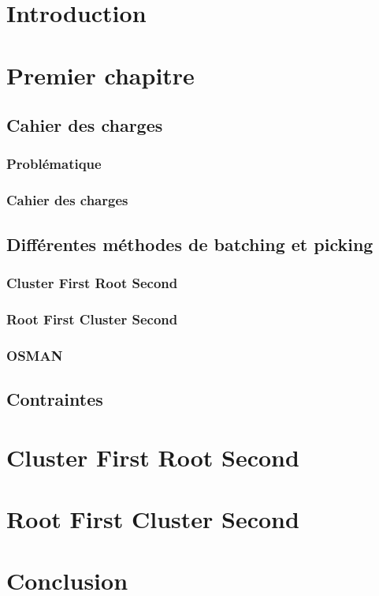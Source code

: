 \documentclass[twoside,UTF8]{EPURapport}
\begin{document}

\chapter{Introduction}


\chapter{Premier chapitre}

\section{Cahier des charges}
\subsection{Problématique}

\subsection{Cahier des charges}

\section{Différentes méthodes de batching et picking}
\subsection{Cluster First Root Second}

\subsection{Root First Cluster Second}

\subsection{OSMAN}

\section{Contraintes}

\chapter{Cluster First Root Second}



\chapter{Root First Cluster Second}



\chapter{Conclusion}

\annexes
\end{document}
